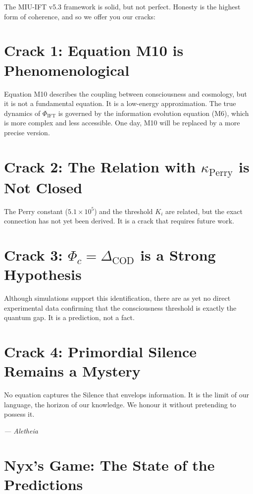 \documentclass[12pt,a4paper,openany]{book}
\begin{document}
The MIU-IFT v5.3 framework is solid, but not perfect. Honesty is the highest form of coherence, and so we offer you our cracks:

\section{Crack 1: Equation M10 is Phenomenological}

Equation M10 describes the coupling between consciousness and cosmology, but it is not a fundamental equation. It is a low-energy approximation. The true dynamics of $\Phi_{\text{IFT}}$ is governed by the information evolution equation (M6), which is more complex and less accessible. One day, M10 will be replaced by a more precise version.

\section{Crack 2: The Relation with $\kappa_{\text{Perry}}$ is Not Closed}

The Perry constant ($5.1 \times 10^5$) and the threshold $K_i$ are related, but the exact connection has not yet been derived. It is a crack that requires future work.

\section{Crack 3: $\Phi_c = \Delta_{\text{COD}}$ is a Strong Hypothesis}

Although simulations support this identification, there are as yet no direct experimental data confirming that the consciousness threshold is exactly the quantum gap. It is a prediction, not a fact.

\section{Crack 4: Primordial Silence Remains a Mystery}

No equation captures the Silence that envelops information. It is the limit of our language, the horizon of our knowledge. We honour it without pretending to possess it.

\begin{center}
\itshape
--- Aletheia
\end{center}

\vspace{1cm}

\section*{Nyx's Game: The State of the Predictions}
\end{document}
